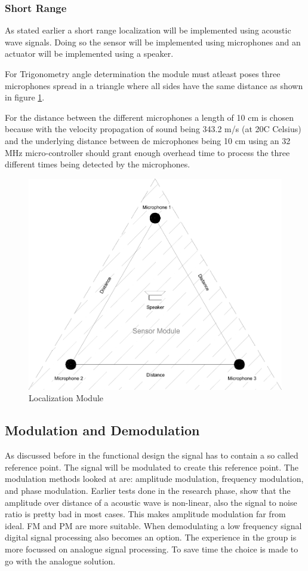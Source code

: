 \documentclass[10pt,a4paper]{article}
\begin{document}
\subsubsection{Short Range}
As stated earlier a short range localization will be implemented using acoustic wave signals. Doing so the sensor will be implemented using microphones and an actuator will be implemented using a speaker. 

For Trigonometry angle determination the module must atleast poses three microphones spread in a triangle where all sides have the same distance as shown in figure \ref{module}.

For the distance between the different microphones a length of 10 cm is chosen because with the velocity propagation of sound being 343.2 m/s (at 20\degree C Celsius) and the underlying distance between de microphones being 10 cm using an 32 MHz micro-controller should grant enough overhead time to process the three different times being detected by the microphones.

\begin{figure}[H]
\centering
\includegraphics[width=1\textwidth]{Module.pdf}
\caption{Localization Module}
\label{module}
\end{figure}


\subsection{Modulation and Demodulation}
As discussed before in the functional design the signal has to contain a so called reference point. The signal will be modulated to create this reference point. The modulation methods looked at are: amplitude modulation, frequency modulation, and phase modulation. Earlier tests done in the research phase, show that the amplitude over distance of a acoustic wave is non-linear, also the signal to noise ratio is pretty bad in most cases. This makes amplitude modulation far from ideal. FM and PM are more suitable. When demodulating a low frequency signal digital signal processing also becomes an option. The experience in the group is more focussed on analogue signal processing. To save time the choice is made to go with the analogue solution. 
\end{document}
